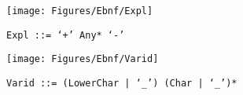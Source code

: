  \begin{figure}[H]
  \centering
  \texttt{[image: Figures/Ebnf/Expl]}
  \caption*{\texttt{Expl \small::=  `{+' Any* `-}'}}
  \label{fig:ebnf-Expl}
 \end{figure}

 \begin{figure}[H]
  \centering
  \texttt{[image: Figures/Ebnf/Varid]}
  \caption*{\texttt{Varid \small::=  (LowerChar | `\_') (Char | `\_')*}}
  \label{fig:ebnf-Varid}
 \end{figure}


